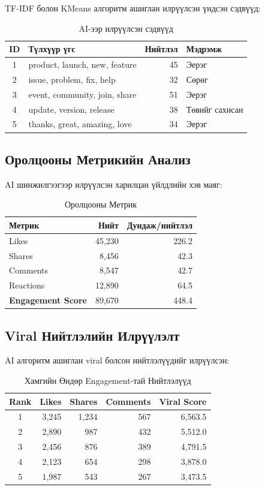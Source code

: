 \documentclass[12pt,a4paper]{report}
\begin{document}
TF-IDF болон KMeans алгоритм ашиглан илрүүлсэн үндсэн сэдвүүд:

\begin{table}[H]
\centering
\caption{AI-ээр илрүүлсэн сэдвүүд}
\begin{tabular}{|c|l|r|l|}
\hline
\textbf{ID} & \textbf{Түлхүүр үгс} & \textbf{Нийтлэл} & \textbf{Мэдрэмж} \\
\hline
1 & product, launch, new, feature & 45 & Эерэг \\
2 & issue, problem, fix, help & 32 & Сөрөг \\
3 & event, community, join, share & 51 & Эерэг \\
4 & update, version, release & 38 & Төвийг сахисан \\
5 & thanks, great, amazing, love & 34 & Эерэг \\
\hline
\end{tabular}
\end{table}

\subsection{Оролцооны Метрикийн Анализ}

AI шинжилгээгээр илрүүлсэн харилцан үйлдлийн хэв маяг:

\begin{table}[H]
\centering
\caption{Оролцооны Метрик}
\begin{tabular}{|l|r|r|}
\hline
\textbf{Метрик} & \textbf{Нийт} & \textbf{Дундаж/нийтлэл} \\
\hline
Likes & 45,230 & 226.2 \\
Shares & 8,456 & 42.3 \\
Comments & 8,547 & 42.7 \\
Reactions & 12,890 & 64.5 \\
\hline
\textbf{Engagement Score} & 89,670 & 448.4 \\
\hline
\end{tabular}
\end{table}

\subsection{Viral Нийтлэлийн Илрүүлэлт}

AI алгоритм ашиглан viral болсон нийтлэлүүдийг илрүүлсэн:

\begin{table}[H]
\centering
\caption{Хамгийн Өндөр Engagement-тай Нийтлэлүүд}
\begin{tabular}{|c|r|r|r|r|}
\hline
\textbf{Rank} & \textbf{Likes} & \textbf{Shares} & \textbf{Comments} & \textbf{Viral Score} \\
\hline
1 & 3,245 & 1,234 & 567 & 6,563.5 \\
2 & 2,890 & 987 & 432 & 5,512.0 \\
3 & 2,456 & 876 & 389 & 4,791.5 \\
4 & 2,123 & 654 & 298 & 3,878.0 \\
5 & 1,987 & 543 & 267 & 3,473.5 \\
\hline
\end{tabular}
\end{table}
\end{document}
